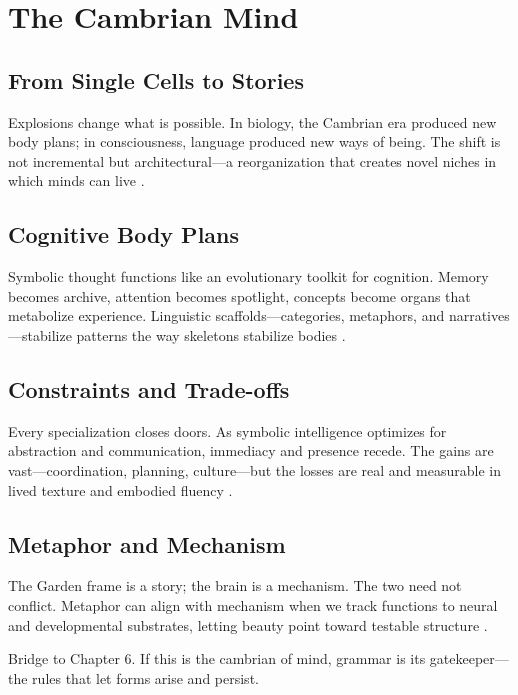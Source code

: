 \chapter{The Cambrian Mind}

\section{From Single Cells to Stories}

Explosions change what is possible. In biology, the Cambrian era produced new body plans; in consciousness, language produced new ways of being. The shift is not incremental but architectural—a reorganization that creates novel niches in which minds can live \parencite{varela1991embodied}.

\section{Cognitive Body Plans}

Symbolic thought functions like an evolutionary toolkit for cognition. Memory becomes archive, attention becomes spotlight, concepts become organs that metabolize experience. Linguistic scaffolds—categories, metaphors, and narratives—stabilize patterns the way skeletons stabilize bodies \parencite{deacon1997symbolic}.

\section{Constraints and Trade-offs}

Every specialization closes doors. As symbolic intelligence optimizes for abstraction and communication, immediacy and presence recede. The gains are vast—coordination, planning, culture—but the losses are real and measurable in lived texture and embodied fluency \parencite{raichle2001default,buckner2008brain}.

\section{Metaphor and Mechanism}

The Garden frame is a story; the brain is a mechanism. The two need not conflict. Metaphor can align with mechanism when we track functions to neural and developmental substrates, letting beauty point toward testable structure \parencite{damasio1999feeling}.

\bigskip
\noindent Bridge to Chapter 6. If this is the cambrian of mind, grammar is its gatekeeper—the rules that let forms arise and persist.
